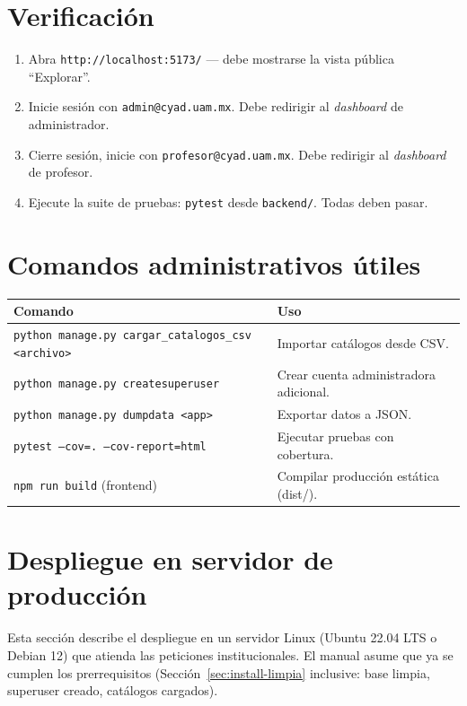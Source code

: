 \documentclass{computacion}
\begin{document}
\section{Verificación}

\begin{enumerate}
    \item Abra \texttt{http://localhost:5173/} — debe mostrarse la vista pública ``Explorar''.
    \item Inicie sesión con \texttt{admin@cyad.uam.mx}. Debe redirigir al \emph{dashboard} de administrador.
    \item Cierre sesión, inicie con \texttt{profesor@cyad.uam.mx}. Debe redirigir al \emph{dashboard} de profesor.
    \item Ejecute la suite de pruebas: \texttt{pytest} desde \texttt{backend/}. Todas deben pasar.
\end{enumerate}

\section{Comandos administrativos útiles}

\begin{longtable}{p{} p{}}
    \toprule
    \textbf{Comando} & \textbf{Uso} \\
    \midrule
    \endhead
    \texttt{python manage.py cargar\_catalogos\_csv <archivo>} & Importar catálogos desde CSV. \\
    \midrule
    \texttt{python manage.py createsuperuser} & Crear cuenta administradora adicional. \\
    \midrule
    \texttt{python manage.py dumpdata <app>} & Exportar datos a JSON. \\
    \midrule
    \texttt{pytest --cov=. --cov-report=html} & Ejecutar pruebas con cobertura. \\
    \midrule
    \texttt{npm run build} (frontend) & Compilar producción estática (dist/). \\
    \bottomrule
\end{longtable}

\section{Despliegue en servidor de producción}
\label{sec:despliegue-produccion}

Esta sección describe el despliegue en un servidor Linux (Ubuntu 22.04 LTS o Debian 12) que atienda las peticiones institucionales. El manual asume que ya se cumplen los prerrequisitos (Sección~\ref{sec:install-limpia} inclusive: base limpia, superuser creado, catálogos cargados).
\end{document}
